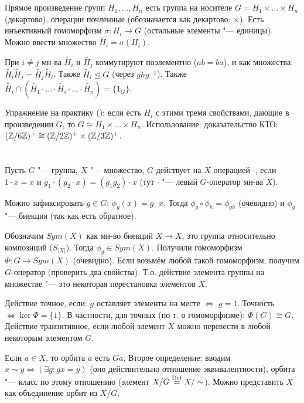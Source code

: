 \section{} %
Прямое произведение групп $H_1, \dots, H_n$ есть группа на носителе $G=H_1 \times \dots \times H_n$
(декартово), операции почленные (обозначается как декартово: $\times$).
Есть инъективный гомоморфизм $\sigma \colon H_i \to G$ (остальные элементы "--- единицы).
Можно ввести множество $\widetilde{H_i}=\sigma(H_i)$.

При $i \neq j$ мн-ва $\widetilde{H_i}$ и $\widetilde{H_j}$ коммутируют поэлементно ($ab=ba$),
и как множества: $\widetilde{H_i}\widetilde{H_j}=\widetilde{H_j}\widetilde{H_i}$.
Также $\widetilde{H_i} \unlhd G$ (через $ghg^{-1}$).
Также $\widetilde{H_i} \cap (\widetilde{H_1}\cdot \dots \cdot \overbar{\widetilde{H_i}} \cdot \dots \cdot \widetilde{H_n})=\{1_G\}$.

Упражнение на практику (\TODO): если есть $H_i$ с этими тремя свойствами, дающие в произведении
$G$, то $G \cong H_1 \times \dots \times H_n$.
Использование: доказательство КТО: $(\mathbb{Z}/6\mathbb{Z})^+ \cong (\mathbb{Z}/2\mathbb{Z})^+ \times (\mathbb{Z}/3\mathbb{Z})^+$.

\section{} %
Пусть $G$ "--- группа, $X$ "--- множество, $G$ действует на $X$ операцией $\cdot$,
если $1\cdot x = x$ и $g_1\cdot(g_2 \cdot x)=(g_1g_2)\cdot x$ (тут $\cdot$ "--- левый
$G$-оператор мн-ва $X$).

Можно зафиксировать $g\in G$: $\phi_g(x) = g \cdot x$.
Тогда $\phi_g \circ \phi_h = \phi_{gh}$ (очевидно) и $\phi_g$ "--- биекция
(так как есть обратное).

Обозначим $Sym(X)$ как мн-во биекций $X \to X$, это группа относительно композиций ($S_{|X|}$).
Тогда $\phi_g \in Sym(X)$.
Получили гомоморфизм $\Phi \colon G \to Sym(X)$ (очевидно).
Если возьмём любой такой гомоморфизм, получим $G$-оператор
(проверить два свойства).
Т.о. действие элемента группы на множестве "--- это некоторая перестановка элементов $X$.

Действие точное, если: $g$ оставляет элементы на месте $\iff$ $g=1$.
Точность $\iff \ker \Phi =\{1\}$.
В частности, для точных (по т. о гомоморфизме): $\Phi(G) \cong G$.
Действие транзитивное, если любой элемент $X$ можно перевести в любой некоторым элементом $G$.

Если $a \in X$, то орбита $a$ есть $Ga$.
Второе определение: вводим $x \sim y \iff (\exists g \colon gx=y)$ (оно
действительно отношение эквивалентности), орбита "--- класс по этому отношению
(элемент $X/G \stackrel{\mathrm{Def}}{=} X/\sim$).
Можно представить $X$ как объединение орбит из $X/G$.
\TODO

\section{} %

\section{} %

\section{} %
